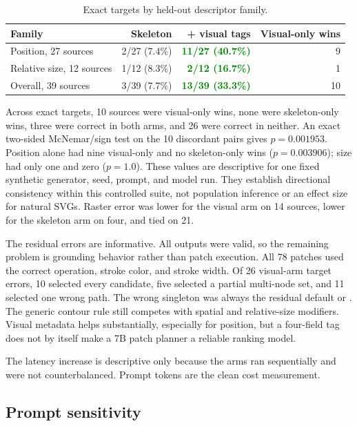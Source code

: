 \documentclass[10pt,a4paper]{article}
\newcommand{\good}[1]{\textcolor{green}{\textbf{#1}}}
\newcommand{\code}[1]{\texttt{\detokenize{#1}}}
\begin{document}
\begin{table}[H]
\centering
\caption{Exact targets by held-out descriptor family.}
\begin{tabular}{@{}lRRR@{}}
\toprule
\textbf{Family} & \textbf{Skeleton} & \textbf{+ visual tags} & \textbf{Visual-only wins}\\
\midrule
Position, 27 sources & 2/27 (7.4\%) & \good{11/27 (40.7\%)} & 9\\
Relative size, 12 sources & 1/12 (8.3\%) & \good{2/12 (16.7\%)} & 1\\
Overall, 39 sources & 3/39 (7.7\%) & \good{13/39 (33.3\%)} & 10\\
\bottomrule
\end{tabular}
\end{table}

Across exact targets, 10 sources were visual-only wins, none were
skeleton-only wins, three were correct in both arms, and 26 were correct in
neither. An exact two-sided McNemar/sign test on the 10 discordant pairs gives
\(p=0.001953\). Position alone had nine visual-only and no skeleton-only wins
(\(p=0.003906\)); size had only one and zero (\(p=1.0\)). These values are
descriptive for one fixed synthetic generator, seed, prompt, and model run.
They establish directional consistency within this controlled suite, not
population inference or an effect size for natural SVGs. Raster error was
lower for the visual arm on 14 sources, lower for the skeleton arm on four,
and tied on 21.

The residual errors are informative. All outputs were valid, so the remaining
problem is grounding behavior rather than patch execution. All 78 patches used
the correct operation, stroke color, and stroke width. Of 26 visual-arm target
errors, 10 selected every candidate, five selected a partial multi-node set,
and 11 selected one wrong path. The wrong singleton was always the residual
default \code{n2} or \code{n5}. The generic contour rule still competes with
spatial and relative-size modifiers. Visual metadata helps substantially,
especially for position, but a four-field tag does not by itself make a 7B
patch planner a reliable ranking model.

The latency increase is descriptive only because the arms ran sequentially and
were not counterbalanced. Prompt tokens are the clean cost measurement.

\subsection{Prompt sensitivity}
\end{document}
